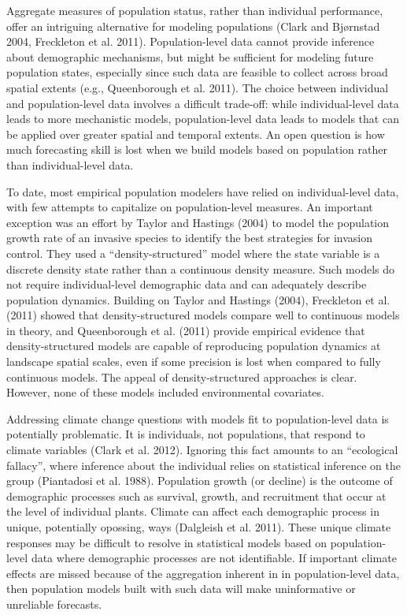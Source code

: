 \documentclass[12pt,]{article}
\begin{document}
Aggregate measures of population status, rather than individual
performance, offer an intriguing alternative for modeling populations
(Clark and Bj{ø}rnstad 2004, Freckleton et al. 2011). Population-level
data cannot provide inference about demographic mechanisms, but might be
sufficient for modeling future population states, especially since such
data are feasible to collect across broad spatial extents (e.g.,
Queenborough et al. 2011). The choice between individual and
population-level data involves a difficult trade-off: while
individual-level data leads to more mechanistic models, population-level
data leads to models that can be applied over greater spatial and
temporal extents. An open question is how much forecasting skill is lost
when we build models based on population rather than individual-level
data.

To date, most empirical population modelers have relied on
individual-level data, with few attempts to capitalize on
population-level measures. An important exception was an effort by
Taylor and Hastings (2004) to model the population growth rate of an
invasive species to identify the best strategies for invasion control.
They used a ``density-structured'' model where the state variable is a
discrete density state rather than a continuous density measure. Such
models do not require individual-level demographic data and can
adequately describe population dynamics. Building on Taylor and Hastings
(2004), Freckleton et al. (2011) showed that density-structured models
compare well to continuous models in theory, and Queenborough et al.
(2011) provide empirical evidence that density-structured models are
capable of reproducing population dynamics at landscape spatial scales,
even if some precision is lost when compared to fully continuous models.
The appeal of density-structured approaches is clear. However, none of
these models included environmental covariates.

Addressing climate change questions with models fit to population-level
data is potentially problematic. It is individuals, not populations,
that respond to climate variables (Clark et al. 2012). Ignoring this
fact amounts to an ``ecological fallacy'', where inference about the
individual relies on statistical inference on the group (Piantadosi et
al. 1988). Population growth (or decline) is the outcome of demographic
processes such as survival, growth, and recruitment that occur at the
level of individual plants. Climate can affect each demographic process
in unique, potentially opossing, ways (Dalgleish et al. 2011). These
unique climate responses may be difficult to resolve in statistical
models based on population-level data where demographic processes are
not identifiable. If important climate effects are missed because of the
aggregation inherent in in population-level data, then population models
built with such data will make uninformative or unreliable forecasts.
\end{document}
